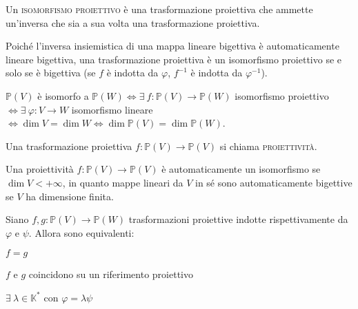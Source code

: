 \begin{defn}
Un \textsc{isomorfismo proiettivo} è una trasformazione proiettiva che ammette un'inversa che sia a sua volta una trasformazione proiettiva.
\end{defn}

\begin{oss}
Poiché l'inversa insiemistica di una mappa lineare bigettiva è automaticamente lineare bigettiva, una trasformazione proiettiva è un isomorfismo proiettivo se e solo se è bigettiva (se $f$ è indotta da $\varphi$, $f^{-1}$ è indotta da $\varphi ^{-1}$).
\end{oss}

\begin{oss}
$\mathbb{P}(V)$ è isomorfo a $\mathbb{P}(W) \Leftrightarrow \exists\ f:\mathbb{P}(V) \rightarrow \mathbb{P}(W)$ isomorfismo proiettivo $\Leftrightarrow \exists\ \varphi :V\rightarrow W$ isomorfismo lineare $\Leftrightarrow \dim V=\dim W \Leftrightarrow \dim \mathbb{P}(V)=\dim \mathbb{P}(W)$.
\end{oss}

\begin{defn}
Una trasformazione proiettiva $f:\mathbb{P}(V)\rightarrow \mathbb{P}(V)$ si chiama \textsc{proiettività}.
\end{defn}

\begin{oss}
Una proiettività $f:\mathbb{P}(V) \rightarrow \mathbb{P}(V)$ è automaticamente un isomorfismo se $\dim V<+\infty$, in quanto mappe lineari da $V$ in sé sono automaticamente bigettive se $V$ ha dimensione finita.
\end{oss}

\begin{lm}
Siano $f,g:\mathbb{P}(V) \rightarrow \mathbb{P}(W)$ trasformazioni proiettive indotte rispettivamente da $\varphi$ e $\psi$. Allora sono equivalenti:
\begin{nlist}
\item $f=g$
\item $f$ e $g$ coincidono su un riferimento proiettivo
\item $\exists\ \lambda \in \mathbb{K}^*$ con $\varphi=\lambda \psi$
\end{nlist}
\end{lm}

